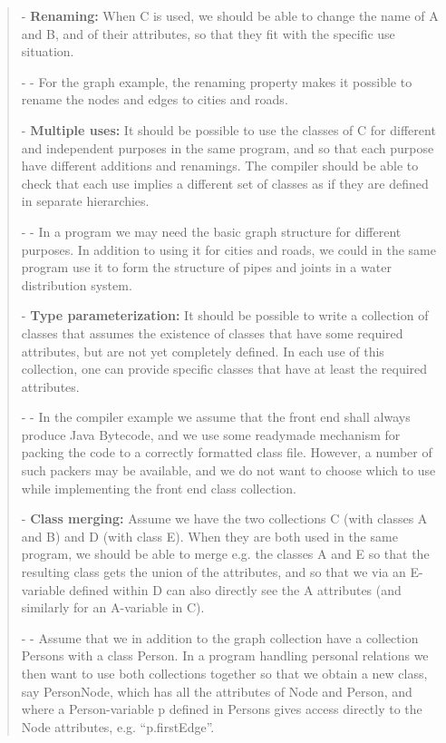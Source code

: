 \begin{quotation}
    - \textbf{Renaming:}  When  C  is  used,  we  should  be  able  to  change  the  name  of  A  and  B,  and of their attributes, so that they fit with the specific use situation.

    - - For  the  graph  example,  the  renaming  property  makes  it  possible  to  rename  the  nodes and edges to cities and roads.

    - \textbf{Multiple  uses:}  It  should  be  possible  to  use  the  classes  of  C  for  different  and  independent  purposes  in  the  same  program,  and  so  that  each  purpose  have  different additions and renamings.
    The compiler should be able to check that each use implies a different set of classes as if they are defined in separate hierarchies.

    - - In  a  program  we  may  need  the  basic  graph  structure  for  different  purposes.
    In  addition  to  using  it  for  cities  and  roads,  we  could  in  the  same  program  use  it  to  form the structure of pipes and joints in a water distribution system.

    - \textbf{Type parameterization:} It should be possible to write a collection of classes that assumes the existence of classes that have some required attributes, but are not yet completely defined.
    In each use of this collection, one can provide specific classes that have at least the required attributes.

    - - In the compiler example we assume that the front end shall always produce Java Bytecode,  and  we  use  some  readymade  mechanism  for  packing  the  code  to  a  correctly  formatted  class  file.
    However,  a  number  of  such  packers  may  be  available,  and  we  do  not  want  to  choose  which  to  use  while  implementing  the  front end class collection.

    - \textbf{Class  merging:}  Assume  we  have  the  two  collections  C  (with  classes  A  and  B)  and D (with class E).
    When they are both used in the same program, we should be able to merge e.g. the classes A and E so that the resulting class gets the union of the attributes, and so that we via an E-variable defined within D can also directly see the A attributes (and similarly for an A-variable in C).

    - - Assume that we in addition to the graph collection have a collection Persons with a class Person.
    In a program handling personal relations we then want to use both collections together so that we obtain a new class, say PersonNode, which has all the  attributes  of  Node  and  Person,  and  where  a  Person-variable  p  defined  in  Persons gives access directly to the Node attributes, e.g. “p.firstEdge”.


\end{quotation}
